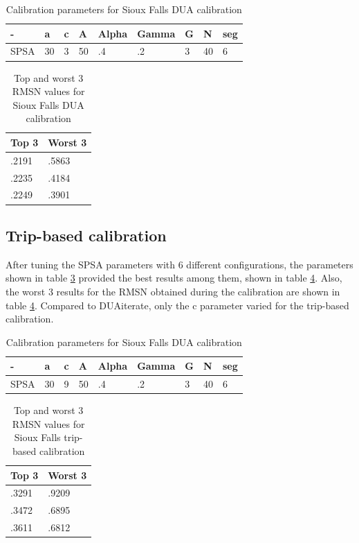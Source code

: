 \begin{table}[htpb]
  \centering
  \begin{tabular}{l l l l l l l l l}
    \toprule
      - & a & c & A & Alpha & Gamma & G & N & seg\\
    \midrule
      SPSA & 30 & 3 & 50 & .4 & .2 & 3 & 40 & 6 \\
    \bottomrule
  \end{tabular}
  \caption[Calibration Parameters SF DUA]{Calibration parameters for Sioux Falls DUA calibration}
  \label{tab:calibration-params-sf-dua}
\end{table}
\begin{table}[htpb]
  \centering
  \begin{tabular}{l l}
    \toprule
      Top 3 & Worst 3 \\
    \midrule
      .2191 & .5863 \\
      .2235 & .4184 \\
      .2249 & .3901 \\
    \bottomrule
  \end{tabular}
  \caption[Top Worst 3 RMSN SF DUA]{Top and worst 3 RMSN values for Sioux Falls DUA calibration}
  \label{tab:top3-rmsn-sf-dua}
\end{table}

\subsection{Trip-based calibration}
After tuning the SPSA parameters with 6 different configurations, the parameters shown in table \ref{tab:calibration-params-sf-dua} provided the best results among them, shown in table \ref{tab:top3-rmsn-sf-dua}. Also, the worst 3 results for the RMSN obtained during the calibration are shown in table \ref{tab:top3-rmsn-sf-dua}. Compared to DUAiterate, only the c parameter varied for the trip-based calibration.

\begin{table}[htpb]
  \centering
  \begin{tabular}{l l l l l l l l l}
    \toprule
      - & a & c & A & Alpha & Gamma & G & N & seg\\
    \midrule
      SPSA & 30 & 9 & 50 & .4 & .2 & 3 & 40 & 6 \\
    \bottomrule
  \end{tabular}
  \caption[Calibration Parameters SF DUA]{Calibration parameters for Sioux Falls DUA calibration}
  \label{tab:calibration-params-sf-dua}
\end{table}
\begin{table}[htpb]
  \centering
  \begin{tabular}{l l}
    \toprule
      Top 3 & Worst 3 \\
    \midrule
      .3291 & .9209 \\
      .3472 & .6895 \\
      .3611 & .6812 \\
    \bottomrule
  \end{tabular}
  \caption[Top Worst 3 RMSN SF trip]{Top and worst 3 RMSN values for Sioux Falls trip-based calibration}
  \label{tab:top3-rmsn-sf-dua}
\end{table}
